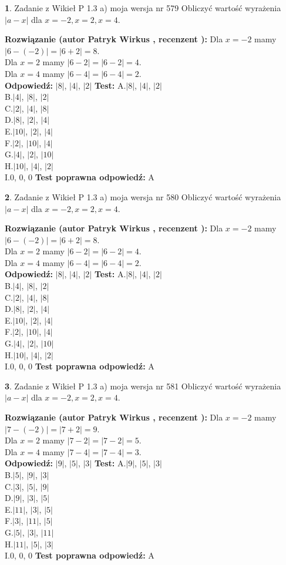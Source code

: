 \documentclass[12pt, a4paper]{article}
\theoremstyle{definition} %
\newtheorem{zad}{}
\newcommand{\zadStart}[1]{\begin{zad}#1\newline}
\newcommand{\zadStop}{\end{zad}}
\newcommand{\rozwStart}[2]{\noindent \textbf{Rozwiązanie (autor #1 , recenzent #2): }\newline}
\newcommand{\rozwStop}{\newline}
\newcommand{\odpStart}{\noindent \textbf{Odpowiedź:}\newline}
\newcommand{\odpStop}{\newline}
\newcommand{\testStart}{\noindent \textbf{Test:}\newline}
\newcommand{\testStop}{\newline}
\newcommand{\kluczStart}{\noindent \textbf{Test poprawna odpowiedź:}\newline}
\newcommand{\kluczStop}{\newline}
\begin{document}
\zadStart{Zadanie z Wikieł P 1.3 a) moja wersja nr 579}
Obliczyć wartość wyrażenia $|a - x|$ dla $x=-2,x=2,x=4$.
\zadStop
\rozwStart{Patryk Wirkus}{}
Dla $x = -2$ mamy $|6 - (-2)| = |6 + 2| = 8$.\\
Dla $x = 2$ mamy $|6 - 2| = |6 - 2| = 4$.\\
Dla $x = 4$ mamy $|6 - 4| = |6 - 4| = 2$.\\
\rozwStop
\odpStart
$|8|$, $|4|$, $|2|$
\odpStop
\testStart
A.$|8|$, $|4|$, $|2|$\\
B.$|4|$, $|8|$, $|2|$\\
C.$|2|$, $|4|$, $|8|$\\
D.$|8|$, $|2|$, $|4|$\\
E.$|10|$, $|2|$, $|4|$\\
F.$|2|$, $|10|$, $|4|$\\
G.$|4|$, $|2|$, $|10|$\\
H.$|10|$, $|4|$, $|2|$\\
I.$0$, $0$, $0$
\testStop
\kluczStart
A
\kluczStop



\zadStart{Zadanie z Wikieł P 1.3 a) moja wersja nr 580}
Obliczyć wartość wyrażenia $|a - x|$ dla $x=-2,x=2,x=4$.
\zadStop
\rozwStart{Patryk Wirkus}{}
Dla $x = -2$ mamy $|6 - (-2)| = |6 + 2| = 8$.\\
Dla $x = 2$ mamy $|6 - 2| = |6 - 2| = 4$.\\
Dla $x = 4$ mamy $|6 - 4| = |6 - 4| = 2$.\\
\rozwStop
\odpStart
$|8|$, $|4|$, $|2|$
\odpStop
\testStart
A.$|8|$, $|4|$, $|2|$\\
B.$|4|$, $|8|$, $|2|$\\
C.$|2|$, $|4|$, $|8|$\\
D.$|8|$, $|2|$, $|4|$\\
E.$|10|$, $|2|$, $|4|$\\
F.$|2|$, $|10|$, $|4|$\\
G.$|4|$, $|2|$, $|10|$\\
H.$|10|$, $|4|$, $|2|$\\
I.$0$, $0$, $0$
\testStop
\kluczStart
A
\kluczStop



\zadStart{Zadanie z Wikieł P 1.3 a) moja wersja nr 581}
Obliczyć wartość wyrażenia $|a - x|$ dla $x=-2,x=2,x=4$.
\zadStop
\rozwStart{Patryk Wirkus}{}
Dla $x = -2$ mamy $|7 - (-2)| = |7 + 2| = 9$.\\
Dla $x = 2$ mamy $|7 - 2| = |7 - 2| = 5$.\\
Dla $x = 4$ mamy $|7 - 4| = |7 - 4| = 3$.\\
\rozwStop
\odpStart
$|9|$, $|5|$, $|3|$
\odpStop
\testStart
A.$|9|$, $|5|$, $|3|$\\
B.$|5|$, $|9|$, $|3|$\\
C.$|3|$, $|5|$, $|9|$\\
D.$|9|$, $|3|$, $|5|$\\
E.$|11|$, $|3|$, $|5|$\\
F.$|3|$, $|11|$, $|5|$\\
G.$|5|$, $|3|$, $|11|$\\
H.$|11|$, $|5|$, $|3|$\\
I.$0$, $0$, $0$
\testStop
\kluczStart
A
\kluczStop
\end{document}
